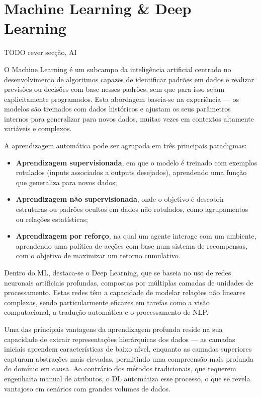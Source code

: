 \section{Machine Learning \& Deep Learning}

TODO rever secção, AI

O Machine Learning é um subcampo da inteligência artificial centrado no desenvolvimento de algoritmos capazes de identificar padrões em dados e realizar previsões ou decisões com base nesses padrões, sem que para isso sejam explicitamente programados. Esta abordagem baseia-se na experiência — os modelos são treinados com dados históricos e ajustam os seus parâmetros internos para generalizar para novos dados, muitas vezes em contextos altamente variáveis e complexos.

A aprendizagem automática pode ser agrupada em três principais paradigmas:
\begin{itemize}
    \item \textbf{Aprendizagem supervisionada}, em que o modelo é treinado com exemplos rotulados (inputs associados a outputs desejados), aprendendo uma função que generaliza para novos dados;
    \item \textbf{Aprendizagem não supervisionada}, onde o objetivo é descobrir estruturas ou padrões ocultos em dados não rotulados, como agrupamentos ou relações estatísticas;
    \item \textbf{Aprendizagem por reforço}, na qual um agente interage com um ambiente, aprendendo uma política de acções com base num sistema de recompensas, com o objetivo de maximizar um retorno cumulativo.
\end{itemize}

Dentro do ML, destaca-se o Deep Learning, que se baseia no uso de redes neuronais artificiais profundas, compostas por múltiplas camadas de unidades de processamento. Estas redes têm a capacidade de modelar relações não lineares complexas, sendo particularmente eficazes em tarefas como a visão computacional, a tradução automática e o processamento de NLP.

Uma das principais vantagens da aprendizagem profunda reside na sua capacidade de extrair representações hierárquicas dos dados — as camadas iniciais aprendem características de baixo nível, enquanto as camadas superiores capturam abstrações mais elevadas, permitindo uma compreensão mais profunda do domínio em causa. Ao contrário dos métodos tradicionais, que requerem engenharia manual de atributos, o DL automatiza esse processo, o que se revela vantajoso em cenários com grandes volumes de dados.

